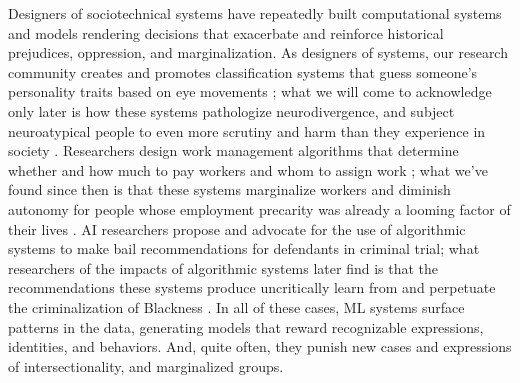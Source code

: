 \documentclass[manuscript,screen]{acmart}
\begin{document}
Designers of sociotechnical systems have repeatedly built computational systems and models rendering decisions that exacerbate and reinforce historical prejudices, oppression, and marginalization.
As designers of systems, our research community creates and promotes classification systems that guess someone's personality traits based on eye movements \cite{Berkovsky:2019:DPT:3290605.3300451};
what we will come to acknowledge only later is how these systems pathologize neurodivergence, and subject neuroatypical people to even more scrutiny and harm than they experience in society
\cite{doi:10.1350/ijps.2010.12.2.174}.
Researchers design work management algorithms that determine whether and how much to pay workers and whom to assign work
\cite{Cai:2016:CRI:2858036.2858237};
 what we've found since then is that these systems marginalize workers and diminish autonomy for people whose employment precarity was already a looming factor of their lives
\cite{10.1145/2384616.2384663,10.1145/3148148,10.1145/2145204.2145354,takingAHITMcInnis,10.1145/2928269}.
AI researchers propose and advocate for the use of algorithmic systems to make bail recommendations for defendants in criminal trial;
what researchers of the impacts of algorithmic systems later find is that the recommendations these systems produce uncritically learn from and perpetuate the criminalization of Blackness
\cite{propublica,corbett2017algorithmic,smiley2016brute}.
In all of these cases, ML systems surface patterns in the data, generating models that reward recognizable expressions, identities, and behaviors.
And, quite often, they punish new cases and expressions of intersectionality, and marginalized groups.
\end{document}
